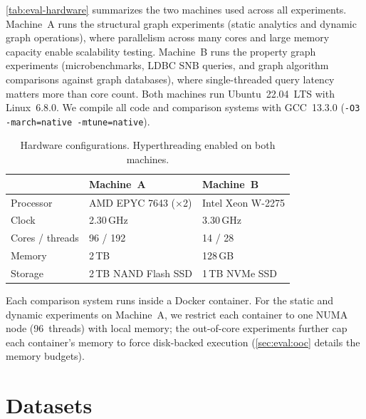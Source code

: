 \autoref{tab:eval-hardware} summarizes the two machines used across all experiments.
Machine~A runs the structural graph experiments (static analytics and dynamic graph operations), where parallelism across many cores and large memory capacity enable scalability testing.
Machine~B runs the property graph experiments (microbenchmarks, LDBC SNB queries, and graph algorithm comparisons against graph databases), where single-threaded query latency matters more than core count.
Both machines run Ubuntu~22.04~LTS with Linux~6.8.0. 
We compile all \project{} code and comparison systems with GCC~13.3.0 (\texttt{-O3 -march=native -mtune=native}).

\begin{table}[h]
  \centering
  \begin{tabular*}{\columnwidth}{@{\extracolsep{\fill}}lll@{}}
    \toprule
    & Machine~A & Machine~B \\
    \midrule
    Processor & AMD EPYC 7643 ($\times$2) & Intel Xeon W-2275 \\
    Clock     & 2.30\,GHz                 & 3.30\,GHz \\
    Cores / threads & 96 / 192            & 14 / 28 \\
    Memory    & 2\,TB                     & 128\,GB \\
    Storage   & 2\,TB NAND Flash SSD      & 1\,TB NVMe SSD \\
    \bottomrule
  \end{tabular*}
  \caption{Hardware configurations.  Hyperthreading enabled on both machines.}
  \label{tab:eval-hardware}
\end{table}

Each comparison system runs inside a Docker container.
For the static and dynamic experiments on Machine~A, we restrict each container to one NUMA node (96~threads) with local memory; the out-of-core experiments further cap each container's memory to force disk-backed execution (\autoref{sec:eval:ooc} details the memory budgets).

\section{Datasets}
\label{sec:eval:datasets}

